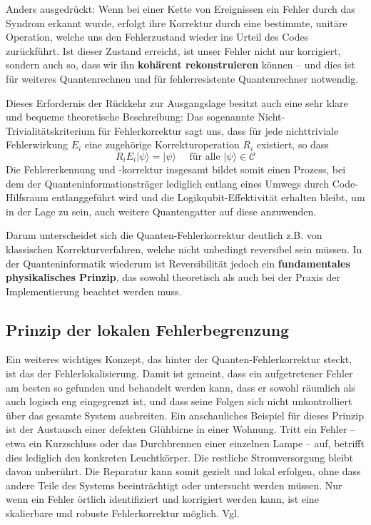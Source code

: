 Anders ausgedrückt: Wenn bei einer Kette von Ereignissen ein Fehler durch das Syndrom erkannt wurde, erfolgt ihre Korrektur durch eine bestimmte, unitäre Operation, welche uns den Fehlerzustand wieder ins Urteil des Codes zurückführt. Ist dieser Zustand erreicht, ist unser Fehler nicht nur korrigiert, sondern auch so, dass wir ihn \textbf{ kohärent rekonstruieren} können – und dies ist für weiteres Quantenrechnen und für fehlerresistente Quantenrechner notwendig.

Dieses Erfordernis der Rückkehr zur Ausgangslage besitzt auch eine sehr klare und bequeme theoretische Beschreibung: Das sogenannte Nicht-Trivialitätskriterium für Fehlerkorrektur sagt uns, dass für jede nichttriviale Fehlerwirkung \(E_i\) eine zugehörige Korrekturoperation \(R_i\) existiert, so dass 
\begin{equation}
    R_{i} E_{i}|\psi\rangle=|\psi\rangle \quad \text { für alle }|\psi\rangle \in \mathcal{C}
\end{equation}
Die Fehlererkennung und -korrektur insgesamt bildet somit einen Prozess, bei dem der Quanteninformationsträger lediglich entlang eines Umwegs durch Code-Hilfsraum entlanggeführt wird und die Logikqubit-Effektivität erhalten bleibt, um in der Lage zu sein, auch weitere Quantengatter auf diese anzuwenden.

Darum unterscheidet sich die Quanten-Fehlerkorrektur deutlich z.B. von klassischen Korrekturverfahren, welche nicht unbedingt reversibel sein müssen. In der Quanteninformatik wiederum ist Reversibilität jedoch ein \textbf{fundamentales physikalisches Prinzip}, das sowohl theoretisch als auch bei der Praxis der Implementierung beachtet werden muss.

\subsection{Prinzip der lokalen Fehlerbegrenzung}
Ein weiteres wichtiges Konzept, das hinter der Quanten-Fehlerkorrektur steckt, ist das der Fehlerlokalisierung. Damit ist gemeint, dass ein aufgetretener Fehler am besten so gefunden und behandelt werden kann, dass er sowohl räumlich als auch logisch eng eingegrenzt ist, und dass seine Folgen sich nicht unkontrolliert über das gesamte System ausbreiten. Ein anschauliches Beispiel für dieses Prinzip ist der Austausch einer defekten Glühbirne in einer Wohnung. Tritt ein Fehler – etwa ein Kurzschluss oder das Durchbrennen einer einzelnen Lampe – auf, betrifft dies lediglich den konkreten Leuchtkörper. Die restliche Stromversorgung bleibt davon unberührt. Die Reparatur kann somit gezielt und lokal erfolgen, ohne dass andere Teile des Systems beeinträchtigt oder untersucht werden müssen. Nur wenn ein Fehler örtlich identifiziert und korrigiert werden kann, ist eine skalierbare und robuste Fehlerkorrektur möglich. Vgl. \cite[Seite 451-452]{nielsen_quantum_2010}

